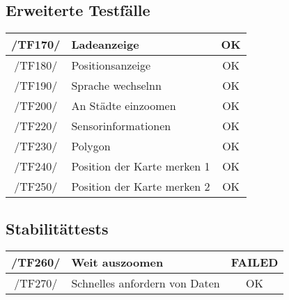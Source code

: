 \subsection{Erweiterte Testfälle}

\begin{center}
    \begin{tabular}[h]{|c|l|c|}
    \hline
        /TF170/ & Ladeanzeige & \cellcolor{green!25}OK \\
        \hline
        /TF180/ & Positionsanzeige & \cellcolor{green!25}OK \\
        \hline
         /TF190/ & Sprache wechselnn & \cellcolor{green!25}OK \\
        \hline
         /TF200/ & An Städte einzoomen & \cellcolor{green!25}OK \\
        \hline
        /TF220/ & Sensorinformationen & \cellcolor{green!25}OK \\
        \hline
         /TF230/ & Polygon & \cellcolor{green!25}OK \\
        \hline
         /TF240/ & Position der Karte merken 1 & \cellcolor{green!25}OK \\
        \hline
          /TF250/ & Position der Karte merken 2 & \cellcolor{green!25}OK \\
        \hline

    \end{tabular}
\end{center}

\subsection{Stabilitättests}
  \begin{center}
      \begin{tabular}[h]{|c|l|c|}
      \hline
       /TF260/ & Weit auszoomen & \cellcolor{red!25}FAILED \\
        \hline
          /TF270/ & Schnelles anfordern von Daten & \cellcolor{green!25}OK \\
        \hline
      \end{tabular}
  \end{center}


